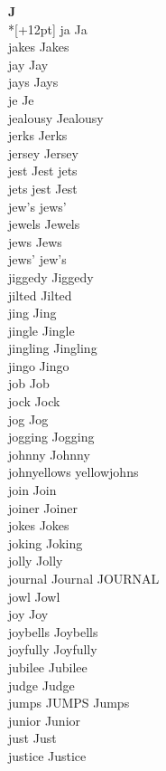 \vspace{14pt}
\noindent\textbf{\Large J}\\*[+12pt]
ja Ja\\
jakes Jakes\\
jay Jay\\
jays Jays\\
je Je\\
jealousy Jealousy\\
jerks Jerks\\
jersey Jersey\\
jest Jest jets\\
jets jest Jest\\
jew's jews'\\
jewels Jewels\\
jews Jews\\
jews' jew's\\
jiggedy Jiggedy\\
jilted Jilted\\
jing Jing\\
jingle Jingle\\
jingling Jingling\\
jingo Jingo\\
job Job\\
jock Jock\\
jog Jog\\
jogging Jogging\\
johnny Johnny\\
johnyellows yellowjohns\\
join Join\\
joiner Joiner\\
jokes Jokes\\
joking Joking\\
jolly Jolly\\
journal Journal JOURNAL\\
jowl Jowl\\
joy Joy\\
joybells Joybells\\
joyfully Joyfully\\
jubilee Jubilee\\
judge Judge\\
jumps JUMPS Jumps\\
junior Junior\\
just Just\\
justice Justice\\

